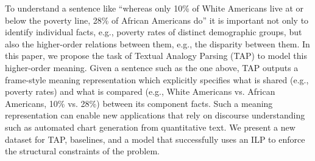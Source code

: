 To understand a sentence like ``whereas only 10\% of White Americans live at or below the poverty line, 28\% of African Americans do''  it is important not only to identify individual facts, e.g., poverty rates of distinct demographic groups, but also the higher-order relations between them, e.g., the disparity between them. In this paper, we propose the task of Textual Analogy Parsing (TAP) to model this higher-order meaning. Given a sentence such as the one above, TAP outputs a frame-style meaning representation which explicitly specifies what is shared (e.g., poverty rates) and what is compared (e.g., White Americans vs. African Americans, 10\% vs. 28\%) between its component facts. Such a meaning representation can enable new applications that rely on discourse understanding such as automated chart generation from quantitative text. We present a new dataset for TAP, baselines, and a model that successfully uses an ILP to enforce the structural constraints of the problem.
